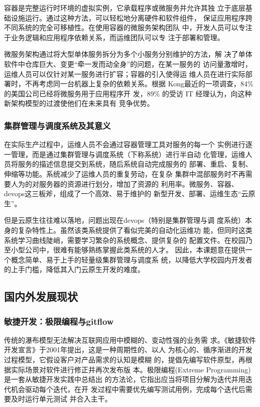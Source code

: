 \documentclass{article}
\begin{document}
  容器是完整运行时环境的虚拟实例，它承载程序或微服务并允许其独
立于底层基础设施运行。通过这种方法，可以轻松地分离硬件和软件组件，
保证应用程序跨不同系统的完全可移植性。在使用容器的微服务架构团队
中，开发人员可以专注于业务逻辑和应用程序依赖关系，而运维团队可以专
注于部署和管理。

  微服务架构通过将大型单体服务拆分为多个小服务分别维护的方法，解
决了单体软件中仓库巨大、变更“牵一发而动全身”的问题，在某一服务的
访问量激增时，运维人员可以仅针对某一服务进行扩容；容器的引入使得运
维人员在进行实际部署时，不再考虑同一台机器上复杂的依赖关系。根据
Kong最近的一项调查\cite{kongMicroserviceRepoert}，84\% 的美国公司已经将微服务用于应用程序开
发，89\% 的受访 IT 经理认为，向这种新架构模型的过渡使他们在未来具有
竞争优势。

\subsubsection{集群管理与调度系统及其意义}
  在实际生产过程中，运维人员不会通过容器管理工具对服务的每一个
实例进行逐一管理，而是通过集群管理与调度系统（下称系统）进行半自动
化管理，运维人员将服务的描述信息提交到系统，随后系统自动完成服务的
部署、重启、复制、伸缩等功能。系统减少了运维人员的重复劳动，在复杂
集群中混部服务时不再需要人为的对服务器的资源进行划分，增加了资源的
利用率。微服务、容器、devops这三板斧，组成了一个高效、易于维护的
新型开发、部署、运维生态“云原生”。

  但是云原生往往难以落地，问题出现在devops（特别是集群管理与调
度系统）本身的复杂特性上。虽然该类系统提供了看似完美的自动化运维功
能，但同时这类系统学习曲线陡峭，需要学习繁杂的系统概念、提供复杂的
配置文件。在校园乃至小型公司中，很难有能够熟练掌握此类系统的人才。
因此，本课题意在提供一个概念简单、易于上手的轻量级集群管理与调度系
统，以降低大学校园内开发者的上手门槛，降低其入门云原生开发的难度。

\subsection{国内外发展现状}
\subsubsection{敏捷开发：极限编程与gitflow}
  传统的瀑布模型无法解决互联网应用中模糊的、变动性强的业务需
求。《敏捷软件开发宣言》\cite{manifestoForAgile}于2001年提出，这是一种周期性的、以人
为核心的、循序渐进的开发过程模型，它假设客户对产品需求的认知是模糊
的，提倡先编写软件原型，再根据实际场景对软件进行修正并再次发布版
本。极限编程(Extreme Programming)\cite{extremeProgramming}是一套从敏捷开发实践中总结出
的方法论，它指出应当将项目分解为迭代并用迭代机会驱动每个迭代，在开
发过程中需要优先编写测试用例，完成每个迭代后需要及时运行单元测试
并合入主干。
\end{document}
